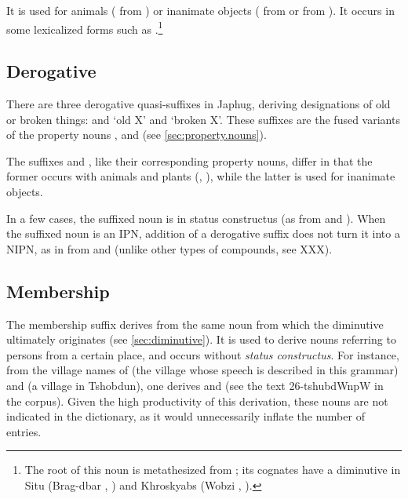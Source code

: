 It is  used for animals ( from ) or inanimate objects ( from  or  from ). It occurs in some lexicalized forms such as .\footnote{The root of this noun is metathesized from ; its cognates have a  diminutive in Situ (Brag-dbar , \citealt[228]{zhang16bragdbar}) and Khroskyabs (Wobzi , \citealt[115]{lai17khroskyabs}).}

\subsection{Derogative} \label{sec:derogative}
There are three derogative quasi-suffixes in Japhug, deriving designations of old or broken things:  and  `old X' and  `broken X'. These suffixes are the fused variants of the property nouns ,  and   (see \ref{sec:property.nouns}). 

The suffixes  and , like their corresponding property nouns, differ in that the former occurs with animals and plants (, ), while the latter is used for inanimate objects.

 In a few cases, the suffixed noun is in status constructus (as  from  and ). When the suffixed noun is an IPN, addition of a derogative suffix does not turn it into a NIPN, as in  from  and  (unlike other types of compounds, see XXX).

\subsection{Membership} 
The membership suffix  derives from the same noun  from which the diminutive  ultimately originates (see \ref{sec:diminutive}). It is used to derive nouns referring to persons from a certain place, and occurs without \textit{status constructus}. For instance, from the village names of  (the village whose speech is described in this grammar) and  (a village in Tshobdun), one derives  and  (see the text 26-tshubdWnpW in the corpus). Given the high productivity of this derivation, these nouns are not indicated in the dictionary, as it would unnecessarily inflate the number of entries.

